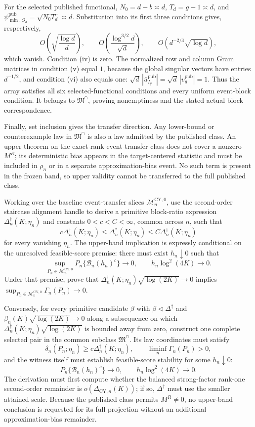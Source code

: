 For the selected published functional, \(N_0=d-b\asymp d\),
\(T_d=g-1\asymp d\), and
\(\psi^{\mathrm{pub}}_{\min,O_d}=\sqrt{N_0T_d}\asymp d\).  Substitution into its first
three conditions gives, respectively,
\[
 O\!\left(\sqrt{\frac{\log d}{d}}\right),\qquad
 O\!\left(\frac{\log^{3/2}d}{\sqrt d}\right),\qquad
 O\!\left(d^{-2/3}\sqrt{\log d}\right),
\]
which vanish.  Condition (iv) is zero.  The normalized row and column
Gram matrices in condition (v) equal \(1\), because the global singular
vectors have entries \(d^{-1/2}\), and condition (vi) also equals one:
\(\sqrt d\,|\bar u^{\mathrm{pub}}_{I_g}|=\sqrt d\,|v_g^{\mathrm{pub}}|=1\).  Thus the array satisfies
all six selected-functional conditions and every uniform event-block
condition.  It belongs to \(\mathfrak M^\cap\), proving nonemptiness and
the stated actual block correspondence.

Finally, set inclusion gives the transfer direction.  Any lower-bound or
counterexample law in \(\mathfrak M^\cap\) is also a law admitted by the
published class.  An upper theorem on the exact-rank event-transfer class
does not cover a nonzero \(M^R\); its deterministic bias appears in the
target-centered statistic and must be included in \(\rho_n\) or in a
separate approximation-bias event.  No such term is present in the frozen
band, so upper validity cannot be transferred to the full published class.

Working over the baseline event-transfer slices
\(\mathcal M_n^{\mathrm{CY},0}\), use the second-order staircase alignment
handle to derive a primitive block-ratio expression
\(\Delta_n^{\dagger}(K;\eta_n)\) and constants
\(0<c<C<\infty\), common across \(n\), such that
\[
 c\Delta_n^{\dagger}(K;\eta_n)
 \le\Delta_n^*(K;\eta_n)
 \le C\Delta_n^{\dagger}(K;\eta_n)
\]
for every vanishing \(\eta_n\).  The upper-band implication is expressly
conditional on the unresolved feasible-score premise: there must exist
\(h_n\downarrow0\) such that
\[
 \sup_{P_n\in\mathcal M_n^{\mathrm{CY},0}}
 P_n\{\mathcal B_n(h_n)^c\}\to0,
 \qquad h_n\log^2(4K)\to0.
\]
Under that premise, prove that
\(\Delta_n^{\dagger}(K;\eta_n)\sqrt{\log(2K)}\to0\) implies
\(\sup_{P_n\in\mathcal M_n^{\mathrm{CY},0}}\Gamma_n(P_n)\to0\).

Conversely, for every primitive candidate \(\beta\) with
\(\beta\triangleleft\Delta^\dagger\) and
\(\beta_n(K)\sqrt{\log(2K)}\to0\) along a subsequence on which
\(\Delta_n^\dagger(K;\eta_n)\sqrt{\log(2K)}\) is bounded away from zero,
construct one complete selected pair in the common subclass
\(\mathfrak M^\cap\).  Its law coordinates must satisfy
\[
 \delta_n(P_n;\eta_n)\ge c\Delta_n^\dagger(K;\eta_n),
 \qquad \liminf_n\Gamma_n(P_n)>0,
\]
and the witness itself must establish feasible-score stability for some
\(h_n\downarrow0\):
\[
 P_n\{\mathcal B_n(h_n)^c\}\to0,
 \qquad h_n\log^2(4K)\to0.
\]
The derivation must first compute whether the balanced strong-factor
rank-one second-order remainder is
\(o(\Delta_{\mathrm{CY},n}(K))\); if so,
\(\Delta^\dagger\) must use the smaller attained scale.  Because the
published class permits \(M^R\ne0\), no upper-band conclusion is requested
for its full projection without an additional approximation-bias remainder.

